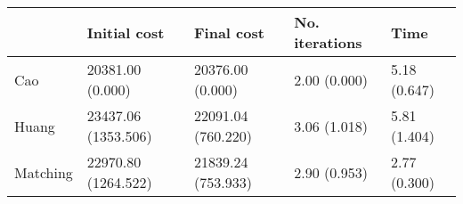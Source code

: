 \begin{tabular}{lllll}
\toprule
{} &         Initial cost &          Final cost & No. iterations &          Time \\
\midrule
Cao      &     20381.00 (0.000) &    20376.00 (0.000) &   2.00 (0.000) &  5.18 (0.647) \\
Huang    &  23437.06 (1353.506) &  22091.04 (760.220) &   3.06 (1.018) &  5.81 (1.404) \\
Matching &  22970.80 (1264.522) &  21839.24 (753.933) &   2.90 (0.953) &  2.77 (0.300) \\
\bottomrule
\end{tabular}

